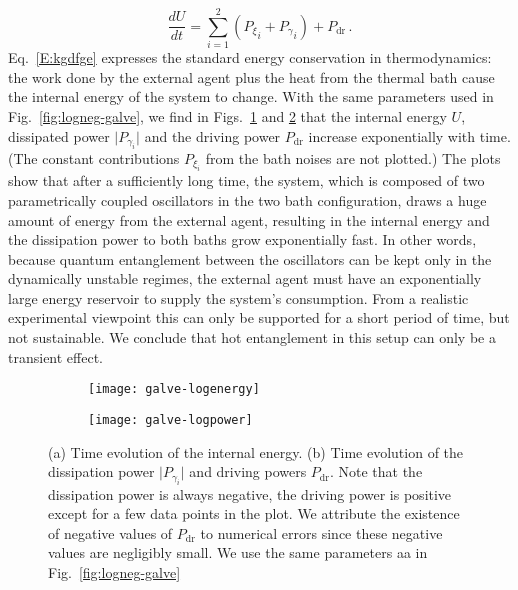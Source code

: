 \documentclass[11pt,a4paper]{article}
\begin{document}
\begin{equation}\label{E:kgdfge}
	\frac{dU}{dt} = \sum_{i=1}^{2} \left({P_{\xi}}_i + {P_{\gamma}}_i \right)  + P_{\text{dr}}\,.
\end{equation}
Eq.~\eqref{E:kgdfge} expresses the standard energy conservation in thermodynamics:  the work done by the external agent plus the heat from the thermal bath cause the internal energy of the system to change. With the same parameters used in Fig.~\ref{fig:logneg-galve}, we find in Figs.~\ref{fig:galve-logenergy} and \ref{fig:galve-logpower} that the internal energy $U$, dissipated power $\lvert P_{\gamma_{i}}\rvert$ and the driving power $P_{\text{dr}}$ {increase exponentially with time}. (The constant contributions $P_{\xi_{i}}$ from the bath noises are not plotted.)   The plots show that after a sufficiently long time, the system, which is composed of two parametrically coupled oscillators in the two bath configuration, draws a huge amount of energy from the external agent, resulting in the internal energy and the dissipation power to both baths grow exponentially fast. In other words, because quantum entanglement between the oscillators can be kept only in the dynamically unstable regimes, the external agent must have an exponentially large energy reservoir to {supply} the system's consumption. From a realistic experimental viewpoint this can only be supported for a short period of time, but not sustainable. We conclude that hot entanglement in this setup can only be a transient effect. 

\begin{figure}
  	\begin{subfigure}{0.49\textwidth}
     	\texttt{[image: galve-logenergy]}     
     	\caption{}
		\label{fig:galve-logenergy}
	\end{subfigure}
 	\hfill
	\begin{subfigure}{0.49\textwidth}
     	\texttt{[image: galve-logpower]}
     	\caption{}
		\label{fig:galve-logpower} 
	\end{subfigure}
	\caption{(a) Time evolution of the internal energy. (b) Time evolution of the dissipation power $\lvert P_{\gamma_{i}}\rvert$ and driving powers $P_{\text{dr}}$. Note that the dissipation power is always negative, the driving power is positive  except for a few data points  in the plot. We attribute the existence of negative values of $P_{\text{dr}}$ to numerical errors since these negative values are negligibly small. We use the same parameters aa in Fig.~\ref{fig:logneg-galve}}
	\label{fig:galve-sympeigen-stable-terms3}
\end{figure}
\end{document}
